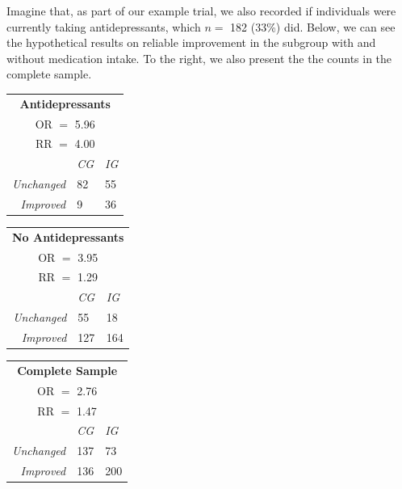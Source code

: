 Imagine that, as part of our example trial, we also recorded if individuals were currently taking antidepressants, which $n=$ 182 (33\%) did. Below, we can see the hypothetical results on reliable improvement in the subgroup with and without medication intake. To the right, we also present the the counts in the complete sample.

\begin{table}[!htbp]
    \centering
    \footnotesize
    \begin{tabular}{|p{1.5cm}||p{0.5cm}|p{0.5cm}|}
        \multicolumn{3}{c}{\textbf{Antidepressants}} \\
        \multicolumn{3}{c}{OR $=$ 5.96} \\
        \multicolumn{3}{c}{RR $=$ 4.00} \\
        \hline
         & \emph{CG} & \emph{IG} \\
        \hline
        \hline
        \multicolumn{1}{|r||}{\emph{Unchanged}}   & 82    & 55 \\
        \hline
        \multicolumn{1}{|r||}{\emph{Improved}} &   9  & 36 \\
        \hline
    \end{tabular}
    \begin{tabular}{|p{1.5cm}||p{0.5cm}|p{0.5cm}|}
        \multicolumn{3}{c}{\textbf{No Antidepressants}} \\
        \multicolumn{3}{c}{OR $=$ 3.95} \\
        \multicolumn{3}{c}{RR $=$ 1.29} \\
        \hline
         & \emph{CG} & \emph{IG} \\
        \hline
        \hline
        \multicolumn{1}{|r||}{\emph{Unchanged}}   & 55    & 18 \\
        \hline
        \multicolumn{1}{|r||}{\emph{Improved}} &   127  & 164 \\
        \hline
    \end{tabular}
    \begin{tabular}{|p{1.5cm}||p{0.5cm}|p{0.5cm}|}
        \multicolumn{3}{c}{\textbf{Complete Sample}} \\
        \multicolumn{3}{c}{OR $=$ 2.76} \\
        \multicolumn{3}{c}{RR $=$ 1.47} \\
        \hline
         & \emph{CG} & \emph{IG} \\
        \hline
        \hline
        \multicolumn{1}{|r||}{\emph{Unchanged}}   & 137    & 73 \\
        \hline
        \multicolumn{1}{|r||}{\emph{Improved}} &   136  & 200 \\
        \hline
    \end{tabular}
\end{table}

